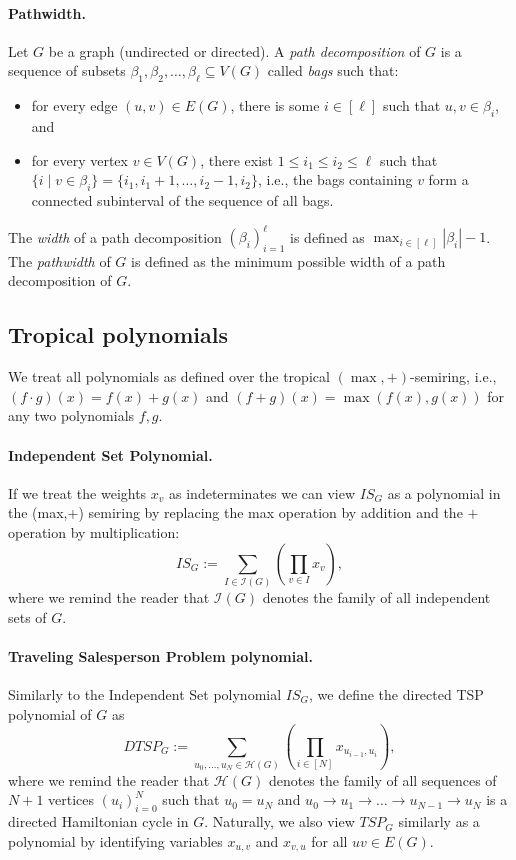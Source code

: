\paragraph{Pathwidth.}
Let $G$ be a graph (undirected or directed). A \emph{path decomposition} of $G$ is a sequence of subsets $\beta_1, \beta_2, \dots, \beta_\ell \subseteq V(G)$ called \emph{bags} such that:
\begin{itemize}
    \item for every edge $(u,v) \in E(G)$, there is some $i \in [\ell]$ such that $u,v \in \beta_i$, and
    \item for every vertex $v \in V(G)$, there exist $1 \leq i_1 \leq i_2 \leq \ell$ such that $\{ i \mid v \in \beta_i \} = \{i_1, i_1 + 1, \dots, i_2 - 1, i_2\}$, i.e., the bags containing $v$ form a connected subinterval of the sequence of all bags.
\end{itemize}
The \emph{width} of a path decomposition $(\beta_i)_{i=1}^\ell$ is defined as $\max_{i \in [\ell]} |\beta_i| - 1$. The \emph{pathwidth} of $G$ is defined as the minimum possible width of a path decomposition of $G$.


\subsection{Tropical polynomials}
We treat all polynomials as defined over the tropical $(\max, +)$-semiring, i.e., $(f \cdot g)(x) = f(x) + g(x)$ and $(f + g)(x) = \max(f(x), g(x))$ for any two polynomials $f, g$.

\paragraph{Independent Set Polynomial.} If we treat the weights $x_v$ as indeterminates we can view $IS_G$ as a polynomial in the (max,+) semiring by replacing the max operation by addition and the $+$ operation by multiplication:
\begin{equation}\label{eq:mwispoly}
    IS_G := \sum_{I \in \mathcal{I}(G)} \left(\prod_{v \in I} x_v\right),
\end{equation}
where we remind the reader that $\mathcal{I}(G)$ denotes the family of all independent sets of $G$.

\paragraph{Traveling Salesperson Problem polynomial.} Similarly to the Independent Set polynomial $IS_G$, we define the directed TSP polynomial of $G$ as
$$
DTSP_G := \sum_{u_0, \dots, u_N \in \mathcal{H}(G)}
\left( \prod_{i \in [N]} x_{u_{i - 1}, u_i} \right),
$$
where we remind the reader that $\mathcal{H}(G)$ denotes the family of all sequences of $N + 1$ vertices $(u_i)_{i =0}^N$ such that $u_0 = u_N$ and $u_0 \to u_1 \to \dots \to u_{N - 1} \to u_N$ is a directed Hamiltonian cycle in $G$.
Naturally, we also view $TSP_G$ similarly as a polynomial by identifying variables $x_{u,v}$ and $x_{v, u}$ for all $uv \in E(G)$.

